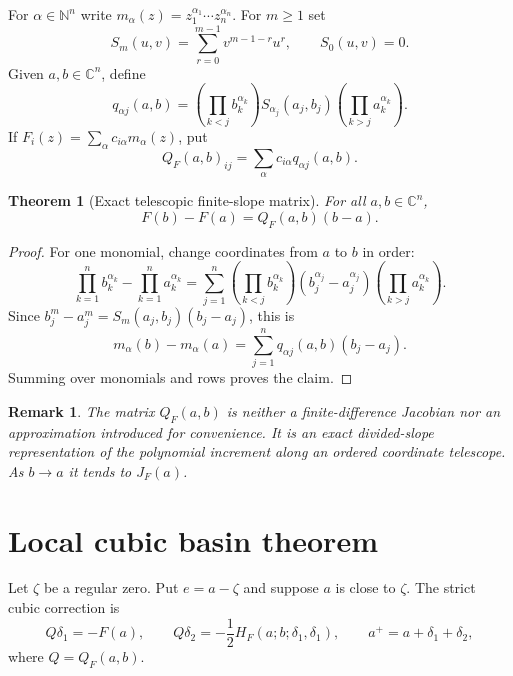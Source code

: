 \documentclass[11pt]{article}
\newtheorem{theorem}[definition]{Theorem}
\newtheorem{remark}[definition]{Remark}
\newcommand{\C}{\mathbb C}
\newcommand{\N}{\mathbb N}
\begin{document}
For $\alpha\in\N^n$ write $m_\alpha(z)=z_1^{\alpha_1}\cdots z_n^{\alpha_n}$.  For $m\geq1$ set
\[
        S_m(u,v)=\sum_{r=0}^{m-1}v^{m-1-r}u^r,
        \qquad S_0(u,v)=0.
\]
Given $a,b\in\C^n$, define
\[
        q_{\alpha j}(a,b)=
        \left(\prod_{k<j}b_k^{\alpha_k}\right)
        S_{\alpha_j}(a_j,b_j)
        \left(\prod_{k>j}a_k^{\alpha_k}\right).
\]
If $F_i(z)=\sum_\alpha c_{i\alpha}m_\alpha(z)$, put
\[
        Q_F(a,b)_{ij}=\sum_\alpha c_{i\alpha}q_{\alpha j}(a,b).
\]

\begin{theorem}[Exact telescopic finite-slope matrix]\label{thm:telescopic}
For all $a,b\in\C^n$,
\[
        F(b)-F(a)=Q_F(a,b)(b-a).
\]
\end{theorem}

\begin{proof}
For one monomial, change coordinates from $a$ to $b$ in order:
\[
\prod_{k=1}^n b_k^{\alpha_k}-\prod_{k=1}^n a_k^{\alpha_k}
=\sum_{j=1}^n
\left(\prod_{k<j}b_k^{\alpha_k}\right)
\left(b_j^{\alpha_j}-a_j^{\alpha_j}\right)
\left(\prod_{k>j}a_k^{\alpha_k}\right).
\]
Since $b_j^m-a_j^m=S_m(a_j,b_j)(b_j-a_j)$, this is
\[
        m_\alpha(b)-m_\alpha(a)=\sum_{j=1}^n q_{\alpha j}(a,b)(b_j-a_j).
\]
Summing over monomials and rows proves the claim.
\end{proof}

\begin{remark}
The matrix $Q_F(a,b)$ is neither a finite-difference Jacobian nor an approximation introduced for convenience.  It is an exact divided-slope representation of the polynomial increment along an ordered coordinate telescope.  As $b\to a$ it tends to $J_F(a)$.
\end{remark}

\section{Local cubic basin theorem}

Let $\zeta$ be a regular zero.  Put $e=a-\zeta$ and suppose $a$ is close to $\zeta$.  The strict cubic correction is
\[
        Q\delta_1=-F(a),\qquad
        Q\delta_2=-\frac12 H_F(a;b;\delta_1,\delta_1),\qquad
        a^+=a+\delta_1+\delta_2,
\]
where $Q=Q_F(a,b)$.
\end{document}
